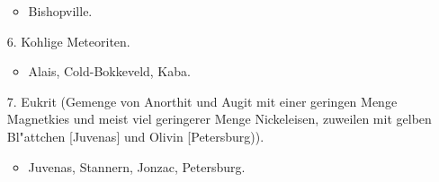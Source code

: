 \documentclass[a4paper, 11pt, oneside]{article}
\begin{document}
\begin{itemize}
\begin{itemize}
        \item Bishopville.
    \end{itemize}
    \item[6.] Kohlige Meteoriten.
    \begin{itemize}
        \item Alais, Cold-Bokkeveld, Kaba.
    \end{itemize}
    \item[7.] Eukrit (Gemenge von Anorthit und Augit mit einer geringen Menge Magnetkies und meist viel geringerer Menge Nickeleisen, zuweilen mit gelben Bl"attchen [Juvenas] und Olivin [Petersburg)).
    \begin{itemize}
        \item Juvenas, Stannern, Jonzac, Petersburg.
    \end{itemize}    
\end{itemize}
\clearpage
\end{document}
